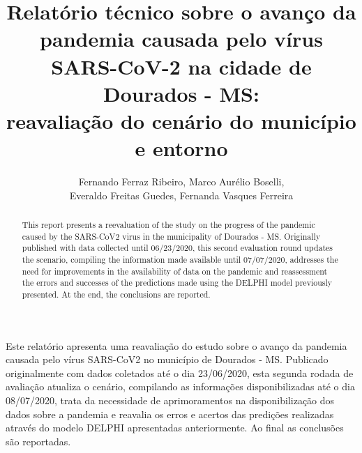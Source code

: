 \documentclass[12pt]{article}
\begin{document}
 


\title{Relatório técnico sobre o avanço da pandemia causada pelo vírus SARS-CoV-2 na cidade de Dourados - MS:\\ reavaliação do cenário do município e entorno}

\author{Fernando Ferraz Ribeiro, Marco Aurélio Boselli,\\ Everaldo Freitas Guedes, Fernanda Vasques Ferreira}


\address{Universidade Federal da Bahia -- Faculdade de Arquitetura -- LCAD
  (UFBA)\\
  Salvador, BA -- Brasil
\nextinstitute
  Universidade Federal de Uberlândia  -- Instituto de Física (UFU)\\
  Uberlândia, MG -- Brasil 
\nextinstitute
  Bacharel em Estatística, Doutor e Mestre em \\Modelagem Computacional Aplicada à Tecnologia Industrial\\
  Salvador, BA -- Brasil
\nextinstitute
  Universidade Federal do Oeste da Bahia (UFOB)\\
  Santa Maria da Vitória, BA -- Brasil
}


\maketitle

\begin{abstract}

This report presents a reevaluation of the study on the progress of the pandemic caused by the SARS-CoV2 virus in the municipality of Dourados - MS. Originally published with data collected until 06/23/2020, this second evaluation round updates the scenario, compiling the information made available until 07/07/2020, addresses the need for improvements in the availability of data on the pandemic and reassessment the errors and successes of the predictions made using the DELPHI model previously presented. At the end, the conclusions are reported.

\end{abstract}
     
\begin{resumo}

Este relatório apresenta uma reavaliação do estudo sobre o avanço da pandemia causada pelo vírus SARS-CoV2 no município de Dourados - MS. Publicado originalmente com dados coletados até o dia 23/06/2020, esta segunda rodada de avaliação atualiza o cenário, compilando as informações disponibilizadas até o dia 08/07/2020,  trata da necessidade de aprimoramentos na disponibilização dos dados sobre a pandemia e reavalia os erros e acertos das predições realizadas através do modelo DELPHI apresentadas anteriormente. Ao final as conclusões são reportadas.

\end{resumo}
\end{document}
